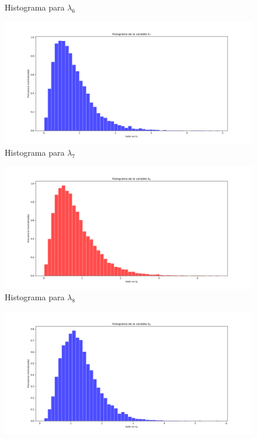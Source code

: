 \documentclass[letterpaper]{article}
\newcommand{\1}{\mathds{1}}
\theoremstyle{definition}
\theoremstyle{definition}
\theoremstyle{definition}
\theoremstyle{definition}
\theoremstyle{definition}
\begin{document}
\begin{itemize}
\begin{figure}[h!]
        \caption{Histograma para $\lambda_{6}$}
    \end{figure} 
    \begin{figure}[h!]
        \centering
        \includegraphics[width=\linewidth]{19.png}
        \caption{Histograma para $\lambda_{7}$}
    \end{figure} 
    \begin{figure}[h!]
        \centering
        \includegraphics[width=\linewidth]{20.png}
        \caption{Histograma para $\lambda_{8}$}
    \end{figure} 
    \begin{figure}[h!]
        \centering
        \includegraphics[width=\linewidth]{21.png}

\end{figure}
\end{itemize}
\end{document}
